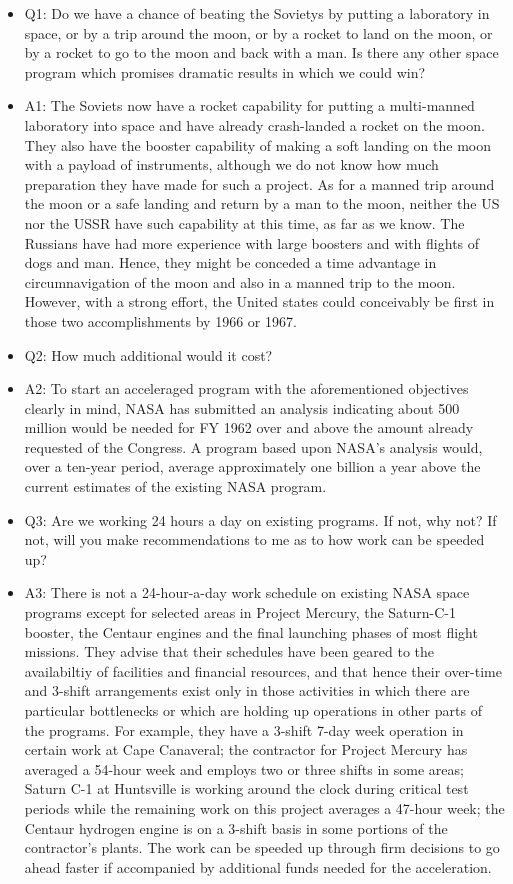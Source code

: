 \documentclass[letterpaper,11pt]{texMemo}
\begin{document}
\begin{itemize}
 \item Q1: Do we have a chance of beating the Sovietys by putting a laboratory in space, or by a trip around the moon, or by a rocket to land on the moon, or by a rocket to go to the moon and back with a man.  Is there any other space program which promises dramatic results in which we could win?
 \item A1: The Soviets now have a rocket capability for putting a multi-manned laboratory into space and have already crash-landed a rocket on the moon.  They also have the booster capability of making a soft landing on the moon with a payload of instruments, although we do not know how much preparation they have made for such a project.  As for a manned trip around the moon or a safe landing and return by a man to the moon, neither the US nor the USSR have such capability at this time, as far as we know.  The Russians have had more experience with large boosters and with flights of dogs and man.  Hence, they might be conceded a time advantage in circumnavigation of the moon and also in a manned trip to the moon.  However, with a strong effort, the United states could conceivably be first in those two accomplishments by 1966 or 1967.
 \item Q2: How much additional would it cost?
 \item A2: To start an acceleraged program with the aforementioned objectives clearly in mind, NASA has submitted an analysis indicating about 500 million would be needed for FY 1962 over and above the amount already requested of the Congress.  A program based upon NASA's analysis would, over a ten-year period, average approximately one billion a year above the current estimates of the existing NASA program.
 \item Q3: Are we working 24 hours a day on existing programs.  If not, why not?  If not, will you make recommendations to me as to how work can be speeded up?
 \item A3: There is not a 24-hour-a-day work schedule on existing NASA space programs except for selected areas in Project Mercury, the Saturn-C-1 booster, the Centaur engines and the final launching phases of most flight missions.  They advise that their schedules have been geared to the availabiltiy of facilities and financial resources, and that hence their over-time and 3-shift arrangements exist only in those activities in which there are particular bottlenecks or which are holding up operations in other parts of the programs.  For example, they have a 3-shift 7-day week operation in certain work at Cape Canaveral; the contractor for Project Mercury has averaged a 54-hour week and employs two or three shifts in some areas; Saturn C-1 at Huntsville is working around the clock during critical test periods while the remaining work on this project averages a 47-hour week; the Centaur hydrogen engine is on a 3-shift basis in some portions of the contractor's plants.  The work can be speeded up through firm decisions to go ahead faster if accompanied by additional funds needed for the acceleration.

\end{itemize}
\end{document}
